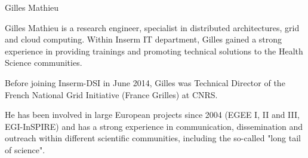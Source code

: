 \begin{participant}[type=R,PM=6,gender=male]{Gilles Mathieu}






  Gilles Mathieu is a research engineer, specialist in distributed
  architectures, grid and cloud computing.  Within Inserm IT department, Gilles
  gained a strong experience in providing trainings and promoting technical
  solutions to the Health Science communities.
  
  Before joining Inserm-DSI in June 2014, Gilles was Technical Director of the
  French National Grid Initiative (France Grilles) at CNRS.
  
  He has been involved in large European projects since 2004 (EGEE I, II and
  III, EGI-InSPIRE) and has a strong experience in communication, dissemination
  and outreach within different scientific communities, including the so-called
  "long tail of science".

\end{participant}

